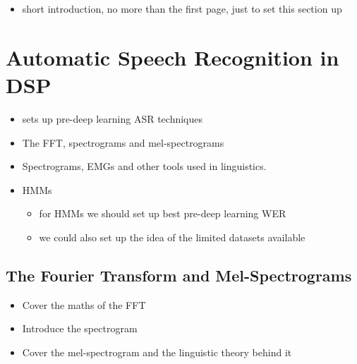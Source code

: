 \begin{itemize}
    \item short introduction, no more than the first page, just to set this section up
\end{itemize}

\section{Automatic Speech Recognition in DSP}
\begin{itemize}
    \item sets up pre-deep learning ASR techniques
    \item The FFT, spectrograms and mel-spectrograms
    \item Spectrograms, EMGs and other tools used in linguistics.
    \item HMMs
    \begin{itemize}
        \item for HMMs we should set up best pre-deep learning WER
        \item we could also set up the idea of the limited datasets available
    \end{itemize}
\end{itemize}



\subsection{The Fourier Transform and Mel-Spectrograms}
\begin{itemize}
    \item Cover the maths of the FFT
    \item Introduce the spectrogram
    \item Cover the mel-spectrogram and the linguistic theory behind it
\end{itemize}

